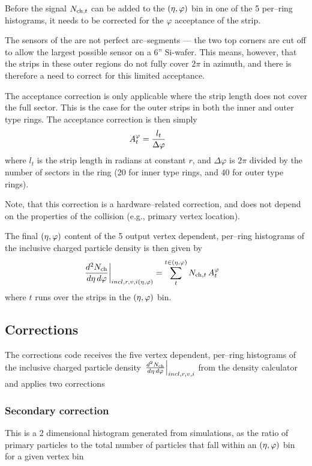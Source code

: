 \documentclass[11pt]{article}
\def\AlwaysText#1{\ifmmode\relax\text{#1}\else #1\fi}
\newcommand{\AbbrName}[1]{\AlwaysText{{\scshape #1}}}
\newcommand{\FMD}[1][]{\AbbrName{fmd\ifx|#1|\else#1\fi}}
\newcommand{\mult}[1][]{\ensuremath N_{\text{ch}#1}}
\newcommand{\dndetadphi}[1][]{{\ensuremath%
    \ifx|#1|\else\left.\fi%
    \frac{d^2\mult{}}{d\eta\,d\varphi}%
    \ifx|#1|\else\right|_{#1}\fi%
}}
\newcommand{\etaphi}{\ensuremath(\eta,\varphi)}
\newcommand{\Corners}{\ensuremath A^{\varphi}_{t}}
\begin{document}
Before the signal $\mult[,t]$ can be added to the $\etaphi$
bin in one of the 5 per--ring histograms, it needs to be corrected for
the $\varphi$ acceptance of the strip.

The sensors of the \FMD{} are not perfect arc--segments --- the two
top corners are cut off to allow the largest possible sensor on a 6''
Si-wafer.   This means, however, that the strips in these outer
regions do not fully cover $2\pi$ in azimuth, and there is therefore a
need to correct for this limited acceptance.  

The acceptance correction is only applicable where the strip length
does not cover the full sector.  This is the case for the outer strips
in both the inner and outer type rings.  The acceptance correction is
then simply 
\begin{align}
  \label{eq:acc_corr}
  \Corners{} &= \frac{l_t}{\Delta\varphi}\quad
\end{align}
where $l_t$ is the strip length in radians at constant $r$, and
$\Delta\varphi$ is $2\pi$ divided by the number of sectors in the
ring (20 for inner type rings, and 40 for outer type rings). 

Note, that this correction is a hardware--related correction, and does
not depend on the properties of the collision (e.g., primary vertex
location). 

The final $\etaphi$ content of the 5 output vertex dependent,
per--ring histograms of the inclusive charged particle density is then
given by
\begin{align}
  \label{eq:density}
  \dndetadphi[incl,r,v,i\etaphi] &= \sum_t^{t\in\etaphi}
  \mult[,t]\,\Corners{}
\end{align}
where $t$ runs over the strips in the $\etaphi$ bin. 

\subsection{Corrections}
\label{sec:sub:corrector}

The corrections code receives the five vertex dependent,
per--ring histograms of the inclusive charged particle density
$\dndetadphi[incl,r,v,i]$ from the density calculator and applies
two corrections 

\subsubsection{Secondary correction}
This is a 2 dimensional histogram generated from simulations, as the
ratio of primary particles to the total number of particles that fall
within an $\etaphi$ bin for a given vertex bin
\end{document}

